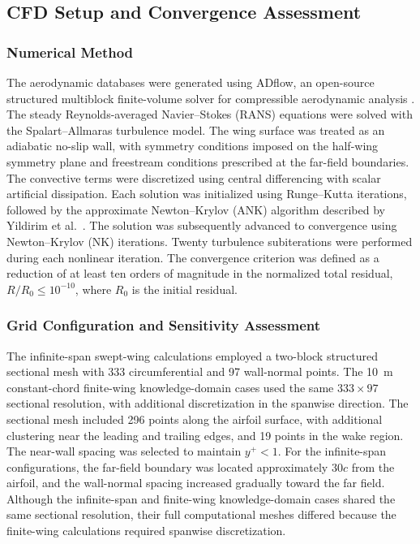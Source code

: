 
\subsection{CFD Setup and Convergence Assessment}
\label{sec:cfd-setup}

\subsubsection{Numerical Method}
\label{sec:numerical-method}

The aerodynamic databases were generated using ADflow, an open-source structured multiblock finite-volume solver for compressible aerodynamic analysis \cite{Mader2020ADflow}. The steady Reynolds-averaged Navier--Stokes (RANS) equations were solved with the Spalart--Allmaras turbulence model. The wing surface was treated as an adiabatic no-slip wall, with symmetry conditions imposed on the half-wing symmetry plane and freestream conditions prescribed at the far-field boundaries. The convective terms were discretized using central differencing with scalar artificial dissipation. Each solution was initialized using Runge--Kutta iterations, followed by the approximate Newton--Krylov (ANK) algorithm described by Yildirim et al.~\cite{Yildirim2019ANK}. The solution was subsequently advanced to convergence using Newton--Krylov (NK) iterations. Twenty turbulence subiterations were performed during each nonlinear iteration. The convergence criterion was defined as a reduction of at least ten orders of magnitude in the normalized total residual, $R/R_0\leq10^{-10}$, where $R_0$ is the initial residual.

\subsubsection{Grid Configuration and Sensitivity Assessment}
\label{sec:grid-sensitivity}

The infinite-span swept-wing calculations employed a two-block structured
sectional mesh with 333 circumferential and 97 wall-normal points.
The \SI{10}{m} constant-chord finite-wing knowledge-domain cases used the
same $333\times97$ sectional resolution, with additional discretization
in the spanwise direction. The sectional mesh included 296 points along
the airfoil surface, with additional clustering near the leading and
trailing edges, and 19 points in the wake region. The near-wall spacing
was selected to maintain $y^{+}<1$. For the infinite-span configurations,
the far-field boundary was located approximately $30c$ from the airfoil,
and the wall-normal spacing increased gradually toward the far field.
Although the infinite-span and finite-wing knowledge-domain cases shared
the same sectional resolution, their full computational meshes differed
because the finite-wing calculations required spanwise discretization.

